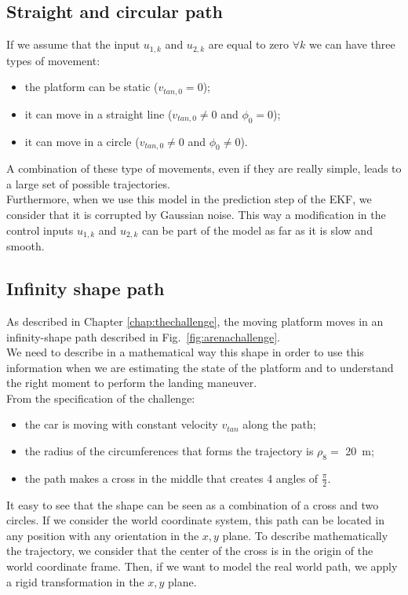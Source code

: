 \subsection{Straight and circular path} \label{subsec:circularlinearmodel}
If we assume that the input $u_{1,k}$ and $u_{2,k}$ are equal to zero $\forall k$ we can have three types of movement:
\begin{itemize}
\item the platform can be static ($v_{tan,0} = 0$);
\item it can move in a straight line ($v_{tan,0} \neq 0$ and $\phi_0 = 0$);
\item it can move in a circle ($v_{tan,0} \neq 0$ and $\phi_0 \neq 0$).
\end{itemize}
A combination of these type of movements, even if they are really simple, leads to a large set of possible trajectories.\\
Furthermore, when we use this model in the prediction step of the EKF, we consider that it is corrupted by Gaussian noise. This way a modification in the control inputs $u_{1,k}$ and $u_{2,k}$ can be part of the model as far as it is slow and smooth.\\

\subsection{Infinity shape path}
As described in Chapter \ref{chap:thechallenge}, the moving platform moves in an infinity-shape path described in Fig.~\ref{fig:arenachallenge}. \\
We need to describe in a mathematical way this shape in order to use this information when we are estimating the state of the platform and to understand the right moment to perform the landing maneuver.\\
From the specification of the challenge:
\begin{itemize}
\item the car is moving with constant velocity $v_{tan}$ along the path;
\item the radius of the circumferences that forms the trajectory is $\rho_{8} =$ \SI{20}{\meter};
\item the path makes a cross in the middle that creates 4 angles of $\frac{\pi}{2}$. 
\end{itemize}
It easy to see that the shape can be seen as a combination of a cross and two circles.
If we consider the world coordinate system, this path can be located in any position with any orientation in the $x,y$ plane. To describe mathematically the trajectory, we consider that the center of the cross is in the origin of the world coordinate frame. Then, if we want to model the real world path, we apply a rigid transformation in the $x,y$ plane.\\

